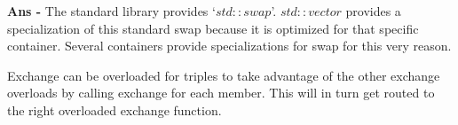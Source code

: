 \documentclass{article}
\begin{document}
\begin{enumerate}
\textbf{Ans - }The standard library provides `$std::swap$'. $std::vector$ provides a specialization of this standard swap because it is optimized for that specific container. Several containers provide specializations for swap for this very reason.

Exchange can be overloaded for triples to take advantage of the other exchange overloads by calling exchange for each member. This will in turn get routed to the right overloaded exchange function.

\end{enumerate}
\end{document}
